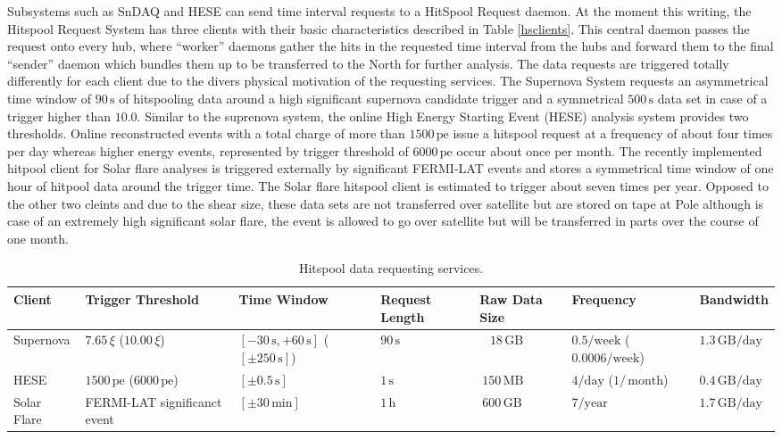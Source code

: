 Subsystems such as SnDAQ and HESE can send time interval requests to a HitSpool
Request daemon. At the moment this writing, the Hitspool Request System has three clients with their basic characteristics described in Table \ref{hsclients}. This central daemon passes the request onto every hub, where ``worker'' daemons gather the hits in the requested time interval from the hubs and forward them to the final ``sender'' daemon which bundles them up to be transferred to the North for further analysis. The data requests are triggered totally differently for each client due to the divers physical motivation of the requesting services. The Supernova System requests an asymmetrical time window of $90 \,\mathrm{s}$ of hitspooling data around a high significant supernova candidate trigger and a symmetrical $500\,\mathrm{s}$ data set in case of a trigger higher than $10.0$.
Similar to the suprenova system, the online High Energy Starting Event (HESE) analysis system provides two thresholds. Online reconstructed events with a total charge of more than $1500 \,\mathrm{pe}$ issue a hitspool request at a frequency of about four times per day whereas higher energy events, represented by  trigger threshold of $6000 \,\mathrm{pe}$ occur about once per month.
The recently implemented hitpool client for Solar flare analyses is triggered externally by significant FERMI-LAT events and stores a symmetrical time window of one hour of hitpool data around the trigger time. The Solar flare hitspool client is estimated to trigger about seven times per year. Opposed to the other two cleints and due to the shear size, these data sets are not transferred over satellite but are stored on tape at Pole although is case of an extremely high significant solar flare, the event is allowed to go over satellite but will be transferred in parts over the course of one month.


\begin{table}
  \caption{Hitspool data requesting services.} 
    \centering
  \footnotesize
\begin{tabularx}{\textwidth}{XXXXXXX}
  \toprule
  Client &  Trigger Threshold & Time Window & Request Length & Raw Data Size & Frequency & Bandwidth \\
  \midrule
  Supernova & $7.65 \,\xi$ ($10.00 \,\xi$) & $[-30\,\mathrm{s},+60\,\mathrm{s}]$  ($[\pm250 \,\mathrm{s}]$)& $90 \,\mathrm{s}$& ~ $18 \,\mathrm{GB}$& $0.5/\mathrm{week}$ ($0.0006 / \mathrm{week}$)& $1.3 \,\mathrm{GB} / \mathrm{day}$\\
  HESE & $1500 \,\mathrm{pe} $  ($6000 \,\mathrm{pe} $) & $[\pm0.5\,\mathrm{s}]$& $1\,\mathrm{s}$  &  $~150\,\mathrm{MB}$ &  $4/\mathrm{day}$ ($1/\,\mathrm{month}$) & $0.4\,\mathrm{GB}/\mathrm{day}$  \\
  Solar Flare & FERMI-LAT significanct event & $[\pm30\,\mathrm{min}]$ & $1\,\mathrm{h}$& $~600\,\mathrm{GB}$& $ 7 / \mathrm{year}$& $ 1.7 \,\mathrm{GB}/\mathrm{day}$\\
\bottomrule
\end{tabularx}
\label{tab:hsclients}
\end{table}

